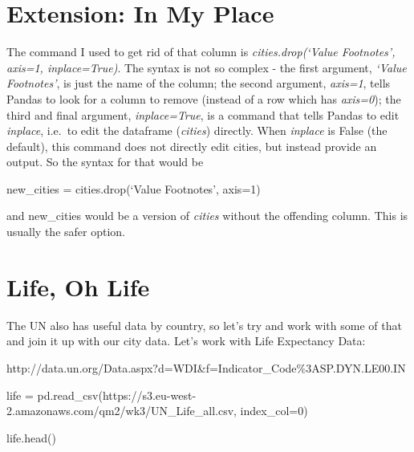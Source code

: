 \documentclass[
  letterpaper,
  DIV=11,
  numbers=noendperiod]{scrreprt}
\newenvironment{Shaded}{\begin{snugshade}}{\end{snugshade}}
\newcommand{\DecValTok}[1]{\textcolor[rgb]{0.68,0.00,0.00}{#1}}
\newcommand{\NormalTok}[1]{\textcolor[rgb]{0.00,0.23,0.31}{#1}}
\newcommand{\OperatorTok}[1]{\textcolor[rgb]{0.37,0.37,0.37}{#1}}
\newcommand{\StringTok}[1]{\textcolor[rgb]{0.13,0.47,0.30}{#1}}
\begin{document}
\hypertarget{extension-in-my-place}{%
\section{Extension: In My Place}\label{extension-in-my-place}}

The command I used to get rid of that column is \emph{cities.drop(`Value
Footnotes', axis=1, inplace=True)}. The syntax is not so complex - the
first argument, \emph{`Value Footnotes'}, is just the name of the
column; the second argument, \emph{axis=1}, tells Pandas to look for a
column to remove (instead of a row which has \emph{axis=0}); the third
and final argument, \emph{inplace=True}, is a command that tells Pandas
to edit \emph{inplace}, i.e.~to edit the dataframe (\emph{cities})
directly. When \emph{inplace} is False (the default), this command does
not directly edit cities, but instead provide an output. So the syntax
for that would be

new\_cities = cities.drop(`Value Footnotes', axis=1)

and new\_cities would be a version of \emph{cities} without the
offending column. This is usually the safer option.

\hypertarget{life-oh-life}{%
\section{Life, Oh Life}\label{life-oh-life}}

The UN also has useful data by country, so let's try and work with some
of that and join it up with our city data. Let's work with Life
Expectancy Data:

http://data.un.org/Data.aspx?d=WDI\&f=Indicator\_Code\%3ASP.DYN.LE00.IN

\begin{Shaded}
\begin{Highlighting}[]
\NormalTok{life }\OperatorTok{=}\NormalTok{ pd.read\_csv(}\StringTok{\textquotesingle{}https://s3.eu{-}west{-}2.amazonaws.com/qm2/wk3/UN\_Life\_all.csv\textquotesingle{}}\NormalTok{, index\_col}\OperatorTok{=}\DecValTok{0}\NormalTok{)}
\end{Highlighting}
\end{Shaded}

\begin{Shaded}
\begin{Highlighting}[]
\NormalTok{life.head()}
\end{Highlighting}
\end{Shaded}
\end{document}
